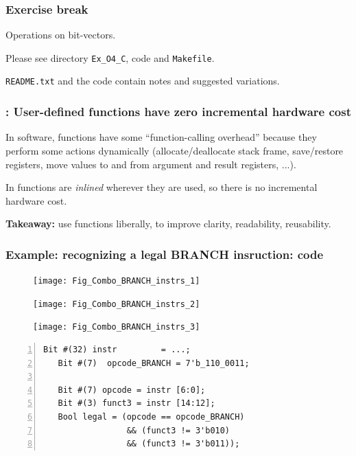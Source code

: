 
\begin{frame}
\frametitle{\EmojiExercise \hmm Exercise break}

Operations on bit-vectors.

\vspace{2ex}

Please see directory {\tt Ex\_O4\_C}, code and {\tt Makefile}.

\vspace*{5ex}

{\tt README.txt} and the code contain notes and suggested variations.

\end{frame}


\begin{frame}[fragile]
\frametitle{{\BSV}: User-defined functions have zero incremental hardware cost}

\footnotesize

In software, functions have some ``function-calling overhead'' because
they perform some actions dynamically (allocate/deallocate stack
frame, save/restore registers, move values to and from argument and
result registers, ...).

\vfill

In {\BSV} functions are \emph{inlined} wherever they are used, so
there is no incremental hardware cost.

\vfill

{\bf Takeaway:} use functions liberally, to improve clarity, readability, reusability.

\end{frame}


\begin{frame}[fragile]
\frametitle{Example: recognizing a legal BRANCH insruction: code}

\footnotesize

\begin{figure}[htbp]
  \centerline{\texttt{[image: Fig\_Combo\_BRANCH\_instrs\_1]}}
  \centerline{\texttt{[image: Fig\_Combo\_BRANCH\_instrs\_2]}}
  \vspace{2mm}
  \centerline{\texttt{[image: Fig\_Combo\_BRANCH\_instrs\_3]}}
\end{figure}

\begin{Verbatim}[frame=single, numbers=left]
   Bit #(32) instr         = ...;
   Bit #(7)  opcode_BRANCH = 7'b_110_0011;

   Bit #(7) opcode = instr [6:0];
   Bit #(3) funct3 = instr [14:12];
   Bool legal = (opcode == opcode_BRANCH)
                 && (funct3 != 3'b010)
                 && (funct3 != 3'b011));
\end{Verbatim}

\end{frame}

